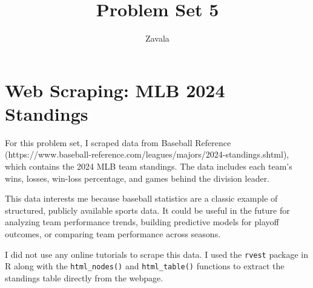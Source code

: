 \documentclass{article}
\begin{document}
\title{Problem Set 5}
\author{Zavala}
\date{}
\maketitle

\section*{Web Scraping: MLB 2024 Standings}

For this problem set, I scraped data from Baseball Reference 
(https://www.baseball-reference.com/leagues/majors/2024-standings.shtml), 
which contains the 2024 MLB team standings. The data includes each team's 
wins, losses, win-loss percentage, and games behind the division leader.

This data interests me because baseball statistics are a classic example 
of structured, publicly available sports data. It could be useful in the 
future for analyzing team performance trends, building predictive models 
for playoff outcomes, or comparing team performance across seasons.

I did not use any online tutorials to scrape this data. I used the 
\texttt{rvest} package in R along with the \texttt{html\_nodes()} and 
\texttt{html\_table()} functions to extract the standings table directly 
from the webpage.
\end{document}
